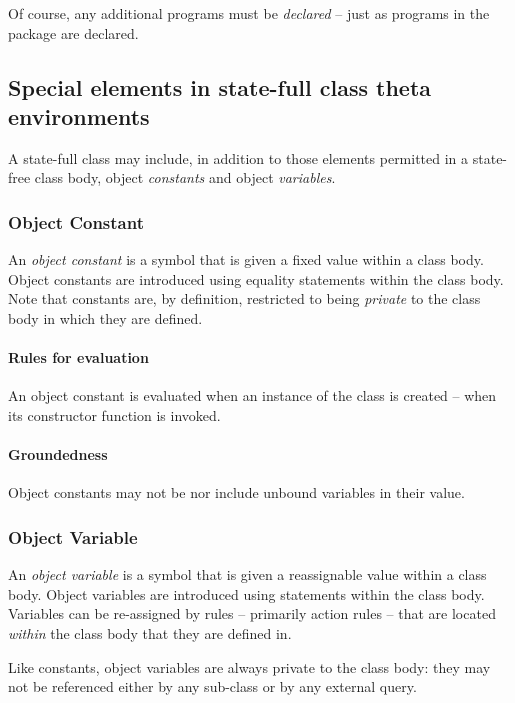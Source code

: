 Of course, any additional programs must be \emph{declared} -- just as programs in the package are declared.

\subsection{Special elements in state-full class theta environments}
A state-full class may include, in addition to those elements permitted in a state-free class body, object \emph{constants} and object \emph{variables}.

\subsubsection{Object Constant}
\label{lo:constant}
An \emph{object constant} is a symbol that is given a fixed value within a class body. Object constants are introduced using equality statements within the class body. Note that constants are, by definition, restricted to being \emph{private} to the class body in which they are defined.

\paragraph{Rules for evaluation}
An object constant is evaluated when an instance of the class is created -- when its constructor function is invoked.

\paragraph{Groundedness}
Object constants may not be nor include unbound variables in their value. 

\subsubsection{Object Variable}
\label{lo:variable}
An \emph{object variable} is a symbol that is given a reassignable value within a class body. Object variables are introduced using \q{:=} statements within the class body. Variables can be re-assigned by rules -- primarily action rules -- that are located \emph{within} the class body that they are defined in. 

Like constants, object variables are always private to the class body: they may not be referenced either by any sub-class or by any external query.

